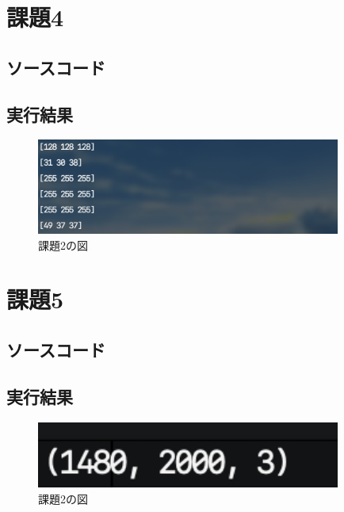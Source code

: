 \documentclass[a4paper,11pt,titlepage]{bxjsarticle}
\begin{document}
\section{課題4}
\subsection{ソースコード}

\subsection{実行結果}
\begin{figure}[htbp]
 \begin{center}
  \includegraphics[width=100mm]{kadai4.png}
 \end{center}
 \caption{課題2の図}
 \label{fig:one}
\end{figure}

\section{課題5}
\subsection{ソースコード}

\subsection{実行結果}
\begin{figure}[htbp]
 \begin{center}
  \includegraphics[width=100mm]{kadai5.png}
 \end{center}
 \caption{課題2の図}
 \label{fig:one}
\end{figure}
\end{document}
